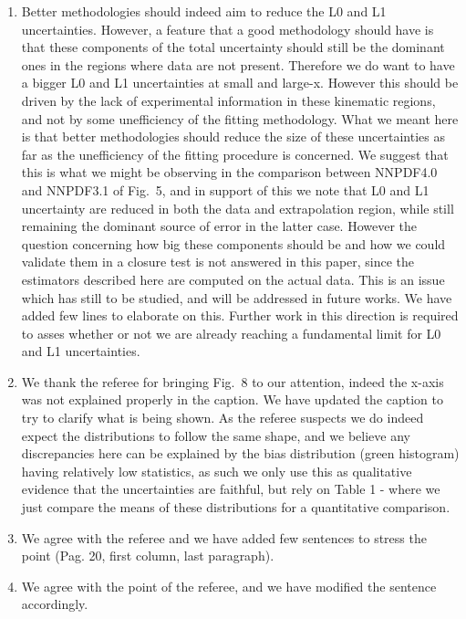 \documentclass[11pt,a4paper]{article}
\numberwithin{equation}{section}
\numberwithin{figure}{section}
\numberwithin{table}{section}
\begin{document}
\begin{enumerate}
    \item Better methodologies should indeed aim to reduce the L0 and L1 uncertainties.
    However, a feature that a good methodology should have is that these components of the total uncertainty should
    still be the dominant ones in the regions where data are not present.
    Therefore we do want to have a bigger L0 and L1 uncertainties at small and large-x.
    However this should be driven by the lack of experimental information in these kinematic regions,
    and not by some unefficiency of the fitting methodology. What we meant here is that better methodologies 
    should reduce the size of these uncertainties as far as the unefficiency of the fitting procedure
    is concerned. We suggest that this is what we might be observing in the comparison
    between NNPDF4.0 and NNPDF3.1 of Fig.~5, and in support of this we note that L0 and L1 uncertainty
    are reduced in both the data and extrapolation region, while still remaining the dominant source of 
    error in the latter case.    
    However the question concerning how big these components should be and how we could validate them 
    in a closure test is not answered in this paper, since the estimators described here 
    are computed on the actual data.
    This is an issue which has still to be studied, and will be addressed in future works.
    We have added few lines to elaborate on this. Further work in this direction is required to 
    asses whether or not we are already reaching a fundamental limit for L0 and L1 uncertainties.
    \item We thank the referee for bringing Fig.~8 to our attention, indeed the x-axis was
    not explained properly in the caption. We have updated the caption to try to clarify what is being shown.
    As the referee suspects we do indeed expect the distributions to follow the same shape, and we believe
    any discrepancies here can be explained by the bias distribution (green histogram)
    having relatively low statistics, as such we only use this as qualitative evidence
    that the uncertainties are faithful, but rely on Table 1 - where we just compare the means of these
    distributions for a quantitative comparison.
    \item We agree with the referee and we have added few sentences to stress the point (Pag. 20, first column, last paragraph).
    \item We agree with the point of the referee, and we have modified the sentence accordingly.
\end{enumerate}





%
%
\end{document}
